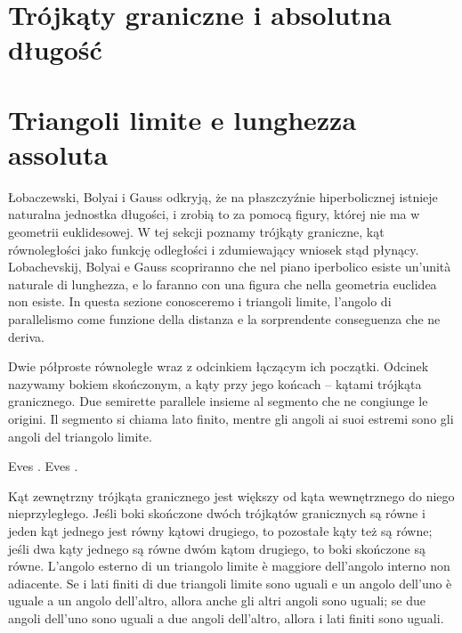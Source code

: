 
\section{Trójkąty graniczne i absolutna długość} %
\section{Triangoli limite e lunghezza assoluta} %
\label{sekcja_trojkaty_graniczne}

Łobaczewski, Bolyai i Gauss odkryją, że na płaszczyźnie hiperbolicznej istnieje naturalna jednostka długości, i zrobią to za pomocą figury, której nie ma w geometrii euklidesowej. %
W tej sekcji poznamy trójkąty graniczne, kąt równoległości jako funkcję odległości i zdumiewający wniosek stąd płynący. %
Lobachevskij, Bolyai e Gauss scopriranno che nel piano iperbolico esiste un'unità naturale di lunghezza, e lo faranno con una figura che nella geometria euclidea non esiste. %
In questa sezione conosceremo i triangoli limite, l'angolo di parallelismo come funzione della distanza e la sorprendente conseguenza che ne deriva. %

\begin{definition}
[trójkąt graniczny] %
[triangolo limite] %
	Dwie półproste równoległe wraz z odcinkiem łączącym ich początki. %
	Odcinek nazywamy bokiem skończonym, a kąty przy jego końcach -- kątami trójkąta granicznego. %
	Due semirette parallele insieme al segmento che ne congiunge le origini. %
	Il segmento si chiama lato finito, mentre gli angoli ai suoi estremi sono gli angoli del triangolo limite. %
\end{definition}

Eves \cite[s. 295]{eves1_1972}. %
Eves \cite[p. 295]{eves1_1972}. %

\begin{proposition}
	Kąt zewnętrzny trójkąta granicznego jest większy od kąta wewnętrznego do niego nieprzyległego. %
	Jeśli boki skończone dwóch trójkątów granicznych są równe i jeden kąt jednego jest równy kątowi drugiego, to pozostałe kąty też są równe; jeśli dwa kąty jednego są równe dwóm kątom drugiego, to boki skończone są równe. %
	L'angolo esterno di un triangolo limite è maggiore dell'angolo interno non adiacente. %
	Se i lati finiti di due triangoli limite sono uguali e un angolo dell'uno è uguale a un angolo dell'altro, allora anche gli altri angoli sono uguali; se due angoli dell'uno sono uguali a due angoli dell'altro, allora i lati finiti sono uguali. %
\end{proposition}

